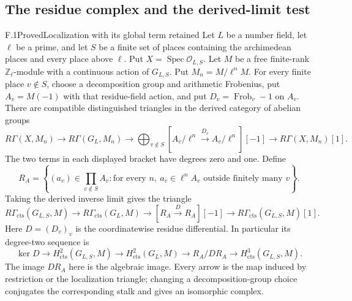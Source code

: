 \subsection{The residue complex and the derived-limit test}

\begin{statement}{F.1}{Proved}{Localization with its global term retained}
Let $L$ be a number field, let $\ell$ be a prime, and let $S$ be a finite set of places containing the archimedean places and every place above $\ell$. Put $X=\operatorname{Spec}\mathcal O_{L,S}$. Let $M$ be a free finite-rank $\mathbb Z_\ell$-module with a continuous action of $G_{L,S}$. Put $M_n=M/\ell^nM$. For every finite place $v\notin S$, choose a decomposition group and arithmetic Frobenius, put $A_v=M(-1)$ with that residue-field action, and put $D_v=\operatorname{Frob}_v-1$ on $A_v$.
There are compatible distinguished triangles in the derived category of abelian groups
\[
 R\Gamma(X,M_n)\longrightarrow R\Gamma(G_L,M_n)
 \longrightarrow
 \bigoplus_{v\notin S}[A_v/\ell^n\xrightarrow{D_v}A_v/\ell^n][-1]
 \longrightarrow R\Gamma(X,M_n)[1].
\]
The two terms in each displayed bracket have degrees zero and one.
Define
\[
 R_A=\left\{(a_v)\in\prod_{v\notin S} A_v:
       \text{for every }n,\ a_v\in\ell^n A_v
       \text{ outside finitely many }v\right\}.
\]
Taking the derived inverse limit gives the triangle
\[
 R\Gamma_{\mathrm{cts}}(G_{L,S},M)
 \longrightarrow R\Gamma_{\mathrm{cts}}(G_L,M)
 \longrightarrow [R_A\xrightarrow{D}R_A][-1]
 \longrightarrow R\Gamma_{\mathrm{cts}}(G_{L,S},M)[1].
\]
Here $D=(D_v)_v$ is the coordinatewise residue differential.
In particular its degree-two sequence is
\[
 \ker D\longrightarrow H^2_{\mathrm{cts}}(G_{L,S},M)
 \longrightarrow H^2_{\mathrm{cts}}(G_L,M)
 \longrightarrow R_A/DR_A
 \longrightarrow H^3_{\mathrm{cts}}(G_{L,S},M).
\]
The image $DR_A$ here is the algebraic image. Every arrow is the map induced by restriction or the localization triangle; changing a decomposition-group choice conjugates the corresponding stalk and gives an isomorphic complex.
\end{statement}
